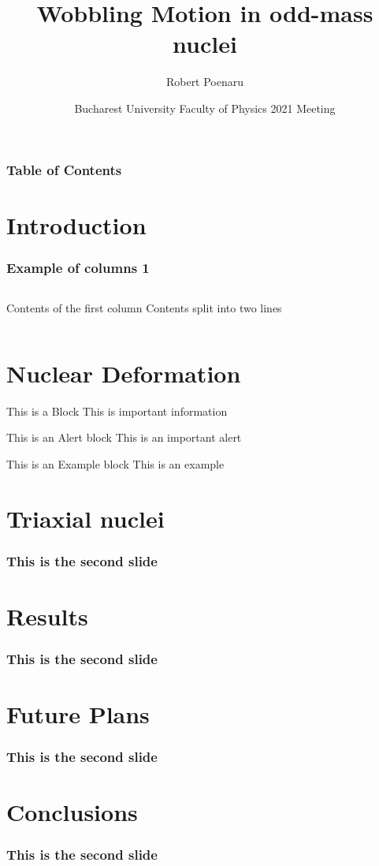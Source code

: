 \documentclass{beamer}
\title[Wobbling Motion in Odd-Mass Nuclei] %
{Wobbling Motion in odd-mass nuclei}
\author[R. Poenaru] %
{Robert Poenaru\inst{1,2}}
\institute[DFT @ IFIN-HH] %
{
  \inst{1}%
  Department of Theoretical Physics\newline
  IFIN-HH
  \and
  \inst{2}%
  Faculty of Physics\newline
  University of Bucharest
}
\date[\today] %
{Bucharest University Faculty of Physics 2021 Meeting}
\begin{document}
\maketitle
\begin{frame}
\frametitle{Table of Contents}
\tableofcontents
\section{Introduction}
\end{frame}
\begin{frame}
    \frametitle{Example of columns 1}
    \begin{columns}[c] %
     Contents of the first column
     Contents split \newline into two lines
    \end{columns}
\end{frame}

\section{Nuclear Deformation}
\begin{frame}

   \begin{block}{This is a Block}
      This is important information
   \end{block}

   \begin{alertblock}{This is an Alert block}
   This is an important alert
   \end{alertblock}

   \begin{exampleblock}{This is an Example block}
   This is an example 
   \end{exampleblock}

\end{frame}
\section{Triaxial nuclei}

  \begin{frame}
    \frametitle{This is the second slide}
  \end{frame}

\section{Results}  

  \begin{frame}
    \frametitle{This is the second slide}
  \end{frame}

\section{Future Plans}

  \begin{frame}
    \frametitle{This is the second slide}
  \end{frame}

\section{Conclusions}

  \begin{frame}
    \frametitle{This is the second slide}
  \end{frame}
\end{document}
